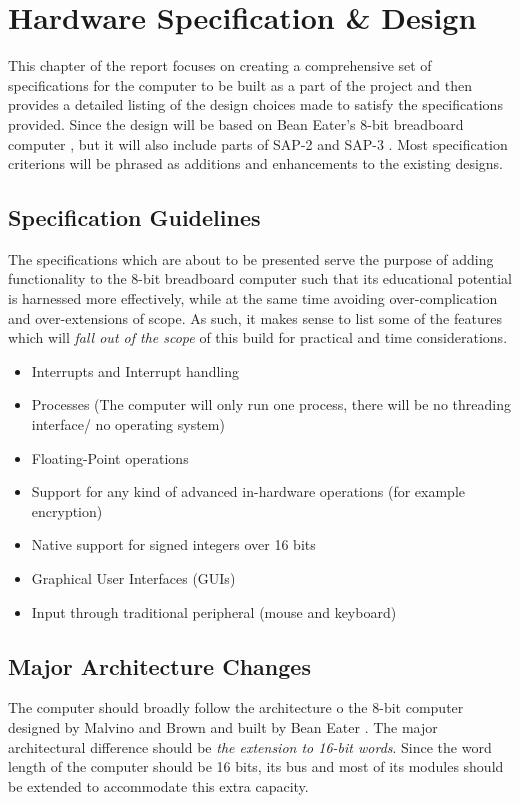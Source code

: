 \chapter{Hardware Specification \& Design}
This chapter of the report focuses on creating a comprehensive set of specifications for the computer
to be built as a part of the project and then provides a detailed listing of the design choices made to satisfy
the specifications provided. Since the design will be based on Bean Eater's 8-bit breadboard computer \cite{eater2019breadboard}, but it will also include parts of SAP-2 and SAP-3 \cite{malvino1992digital}. Most specification criterions will be phrased as additions and enhancements to the existing designs.

\section{Specification Guidelines}
The specifications which are about to be presented serve the purpose of adding functionality to the 8-bit breadboard computer such
that its educational potential is harnessed more effectively, while at the same time avoiding over-complication and over-extensions
of scope. As such, it makes sense to list some of the features which will \emph{fall out of the scope} of this build for practical
and time considerations.
\begin{itemize}
  \item Interrupts and Interrupt handling
  \item Processes (The computer will only run one process, there will be no threading interface/ no operating system)
  \item Floating-Point operations
  \item Support for any kind of advanced in-hardware operations (for example encryption)
  \item Native support for signed integers over 16 bits
  \item Graphical User Interfaces (GUIs)
  \item Input through traditional peripheral (mouse and keyboard)
\end{itemize}

\section{Major Architecture Changes}
The computer should broadly follow the architecture o the 8-bit computer designed by Malvino and Brown \cite{malvino1992digital} and built by Bean Eater \cite{eater2019breadboard}. The major architectural difference should be \emph{the extension to 16-bit words}.
Since the word length of the computer should be 16 bits, its bus and most of its modules should be extended to accommodate this extra capacity.

